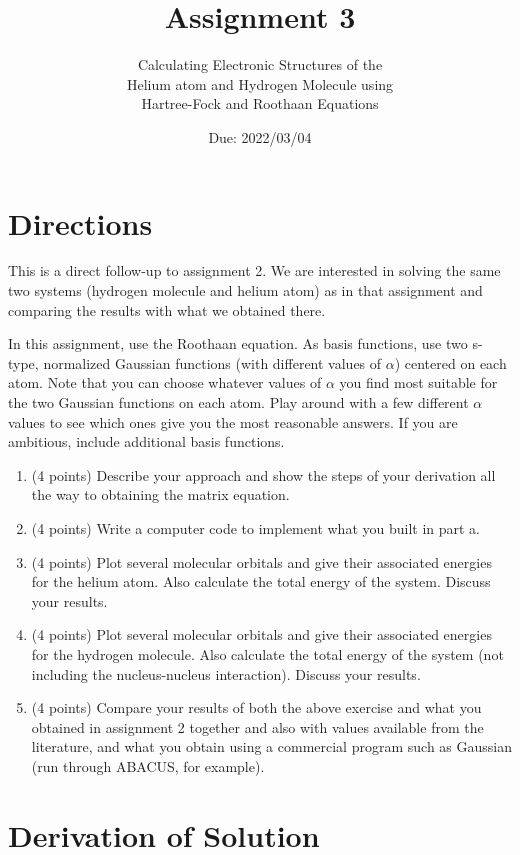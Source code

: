 \documentclass[10pt, oneside, letterpaper]{article}
\title{Assignment 3}
\author{Calculating Electronic Structures of the \\ Helium atom and Hydrogen Molecule using \\Hartree-Fock and Roothaan Equations}
\date{Due: 2022/03/04}
\begin{document}
\maketitle
\thispagestyle{fancy}

\section{Directions}

This is a direct follow-up to assignment 2. We are interested in solving the same two systems (hydrogen molecule and helium atom) as in that assignment and comparing the results with what we obtained there.

In this assignment, use the Roothaan equation. As basis functions, use two s-type, normalized Gaussian functions (with different values of $\alpha$) centered on each atom. Note that you can choose whatever values of $\alpha$ you find most suitable for the two Gaussian functions on each atom. Play around with a few different $\alpha$ values to see which ones give you the most reasonable answers. If you are ambitious, include additional basis functions.

\begin{enumerate}[label=(\alph*)]
  \item (4 points) Describe your approach and show the steps of your derivation all the way to obtaining the matrix equation.
  \item (4 points) Write a computer code to implement what you built in part a.
  \item (4 points) Plot several molecular orbitals and give their associated energies for the helium atom. Also calculate the total energy of the system. Discuss your results.
  \item (4 points) Plot several molecular orbitals and give their associated energies for the hydrogen molecule. Also calculate the total energy of the system (not including the nucleus-nucleus interaction). Discuss your results.
  \item (4 points) Compare your results of both the above exercise and what you obtained in assignment 2 together and also with values available from the literature, and what you obtain using a commercial program such as Gaussian (run through ABACUS, for example).
\end{enumerate}

\section{Derivation of Solution}
\end{document}
